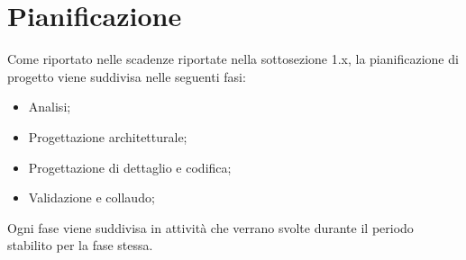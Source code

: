 \section{Pianificazione}
Come riportato nelle scadenze riportate nella sottosezione 1.x, la pianificazione di progetto viene suddivisa nelle seguenti fasi:
\begin{itemize}
	\item Analisi;
	\item Progettazione architetturale;
	\item Progettazione di dettaglio e codifica;
	\item Validazione e collaudo;
\end{itemize}
Ogni fase viene suddivisa in attività che verrano svolte durante il periodo stabilito per la fase stessa.




